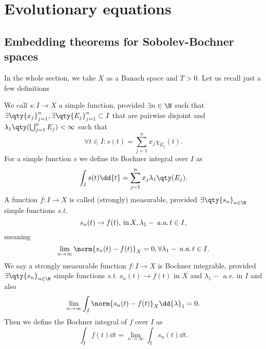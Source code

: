 
\section{Evolutionary equations}
\label{sec:evolutionray_eqs}

\subsection{Embedding theorems for Sobolev-Bochner spaces}
\label{sec:Sobolev-Bochner}
In the whole section, we take $X$ as a Banach space and $T>0.$ Let us recall just a few definitions

\begin{definition}
	We call $s: I \to X$ a simple function, provided $\exists n \in \N$ such that $\exists \qty{x_j}_{j=1}^n, \exists \qty{E_j}_{j=1}^n \subset I$ that are pairwise disjoint and $\lambda_1\qty(\bigcup_{j=1}^n E_j) < \infty$ such that
	\[
		\forall t \in I: s(t) = \sum_{j=1}^n x_j \chi_{E_j}(t).
	\]
	For a simple function $s$ we define its Bochner integral over $I$ as
	\[
		\int_I s(t)\dd{t} = \sum_{j=1}^n x_j \lambda_1\qty(E_j).
	\]
	A function $f: I \to X$ is called (strongly) measurable, provided $\exists \qty{s_n}_{n \in \N}$ simple functions \textit{s.t.}
	\[
		s_n(t) \to f(t), \, \text{in} \, X,  \lambda_1-\, \text{\textit{a.a.}} \, t \in I,
	\]
	meaning
	\[
		\lim_{n \to \infty}\norm{s_n(t) - f(t)}_{X} = 0, \forall \lambda_1-\, \text{\textit{a.a.}} \,t \in I.
	\]
	We say a strongly measurable function $f: I \to X$ is Bochner integrable, provided $\exists \qty{s_n}_{n \in \N}$ simple functions \textit{s.t.} $s_n(t) \to f(t)$ in $X$ and $\lambda_1-$ \textit{a.e.} in $I$ and also
	\[
		\lim_{n \to \infty} \int_I \norm{s_n(t) - f(t)}_X \dd{\lambda}_1 = 0.
	\]
	Then we define the Bochner integral of $f$ over $I$ as
	\[
		\int_I f(t) \dd{t} = \lim_{n \to \infty} \int_I s_n(t) \dd{t}.
	\]
\end{definition}

